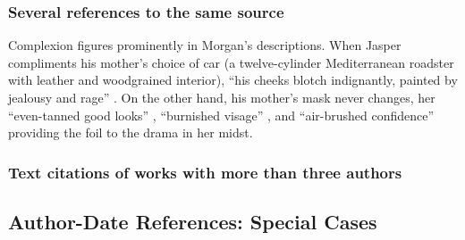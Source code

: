 \documentclass[11pt,letterpaper,oneside]{article}
\begin{document}
\begin{citeref}
\item \parencite{hetherington2015,grove2015}
\end{citeref}

\begin{citeref}
\item \parencite{doershuk2017}
\item \parencite{doershuk2016}
\end{citeref}

\setcounter{subsubsection}{26}
\subsubsection{Several references to the same source}

\begin{citeref}%
\item Complexion figures prominently in Morgan's descriptions. When
Jasper compliments his mother's choice of car (a twelve-cylinder
Mediterranean roadster with leather and wood\-grained interior), ``his
cheeks blotch indignantly, painted by jealousy and rage''
\parencite[47]{chaston2000}. On the other hand, his mother's mask
never changes, her ``even-tanned good looks''
\parencite[56]{chaston2000}, ``burnished visage''
\parencite[101]{chaston2000}, and ``air-brushed confidence''
\parencite[211]{chaston2000} providing the foil to the drama in her
midst.
\end{citeref}

\setcounter{subsubsection}{28}
\subsubsection{Text citations of works with more than three authors}

\begin{citeref}
\item \parencite{schonen2017a}
\item \parencite{schonen2017b}
\end{citeref}

\setcounter{subsection}{2}
\subsection{Author-Date References: Special Cases}
\setcounter{subsection}{15}
\end{document}
